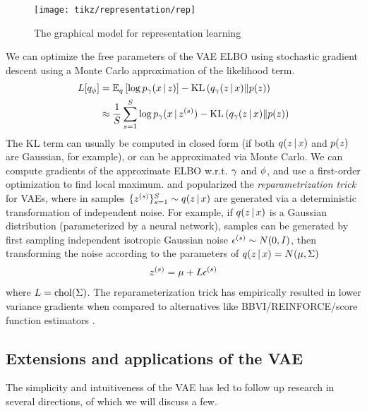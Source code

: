 \begin{figure}[htp!]
    \centering
    \texttt{[image: tikz/representation/rep]}
    \caption{The graphical model for representation learning}
    \label{fig:graphical-model-rep}
\end{figure}

We can optimize the free parameters of the VAE ELBO
using stochastic gradient descent
using a Monte Carlo approximation of the likelihood term.
\begin{align*}
L[q_\phi] &= \mathbb{E}_q \left[ \log p_\gamma(x \,|\, z)\right] - \mathrm{KL}\left(q_\gamma(z \,|\, x)\|p(z)\right) \\
                 &\approx \frac{1}{S}\sum_{s = 1}^S \log p_\gamma(x \,|\, z^{(s)}) - \mathrm{KL}\left(q_\gamma(z \,|\, x)\|p(z)\right)
\end{align*}
The KL term can usually be computed in closed form (if both $q(z \,|\, x)$ and $p(z)$ are Gaussian, for example), or can be approximated
via Monte Carlo. We can compute gradients of the approximate
ELBO w.r.t. $\gamma$ and $\phi$, and use a
first-order optimization to find local maximum. \citet{Kingma2014} and \citet{Rezende2014}
popularized the \emph{reparametrization trick} for VAEs,
where in samples $\{z^{(s)}\}_{s = 1}^S \sim q(z \,|\, x)$ are generated
via a deterministic transformation of independent noise.
For example, if $q(z \,|\, x)$ is a Gaussian distribution (parameterized
by a neural network), samples can be generated
by first sampling independent isotropic Gaussian noise $\epsilon^{(s)} \sim N(0, I)$, then transforming the noise according to the parameters
of $q(z \,|\, x) = N(\mu, \Sigma)$
\begin{align*}
    z^{(s)} = \mu + L\epsilon^{(s)}
\end{align*}
where $L = \mathrm{chol}(\Sigma)$. The reparameterization trick
has empirically resulted in lower variance gradients
when compared to alternatives
like BBVI/REINFORCE/score function estimators \citep{Ranganath2014, Williams1992}.

\subsection{Extensions and applications of the VAE}
The simplicity and intuitiveness of the
VAE has led to follow up research
in several directions, of which we
will discuss a few.


